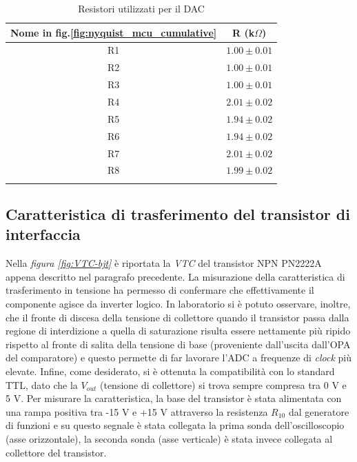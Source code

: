 \documentclass[journal]{IEEEtran}
\begin{document}
\begin{table}[H]
\begin{center}
\caption{Resistori utilizzati per il DAC}
\begin{tabular}{c|c}
\hline
Nome in fig.\ref{fig:nyquist_mcu_cumulative} & R (k$\Omega $) \\ \hline
R1  & $1.00 \pm 0.01$ \\
R2  & $1.00 \pm 0.01$ \\
R3  & $1.00 \pm 0.01$ \\
R4  & $2.01 \pm 0.02$ \\
R5  & $1.94 \pm 0.02$ \\
R6  & $1.94 \pm 0.02$ \\
R7  & $2.01 \pm 0.02$ \\
R8  & $1.99 \pm 0.02$ \\

\label{tab:resistori_dac}
\end{tabular}
\end{center}
\end{table}


\subsection{Caratteristica di trasferimento del transistor di interfaccia}
Nella \textit{figura \ref{fig:VTC-bjt}} è riportata la \textit{VTC} del transistor NPN PN2222A appena descritto nel paragrafo precedente. La misurazione della caratteristica di trasferimento in tensione ha permesso di confermare che effettivamente il componente agisce da inverter logico. In laboratorio si è potuto osservare, inoltre, che il fronte di discesa della tensione di collettore quando il transistor passa dalla regione di interdizione a quella di saturazione risulta essere nettamente più ripido rispetto al fronte di salita della tensione di base (proveniente dall'uscita dall'OPA del comparatore) e questo permette di far lavorare l'ADC a frequenze di \textit{clock} più elevate. Infine, come desiderato, si è ottenuta la compatibilità con lo standard TTL, dato che la $V_{out}$ (tensione di collettore) si trova sempre compresa tra 0 V e 5 V. Per misurare la caratteristica, la base del transistor è stata alimentata con una rampa positiva tra -15 V e +15 V attraverso la resistenza $R_{10}$ dal generatore di funzioni e su questo segnale è stata collegata la prima sonda dell'oscilloscopio (asse orizzontale), la seconda sonda (asse verticale) è stata invece collegata al collettore del transistor.
\end{document}
